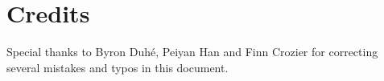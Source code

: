 \section{Credits}

Special thanks to Byron Duh\'{e}, Peiyan Han and Finn Crozier for correcting several mistakes and typos in this document.